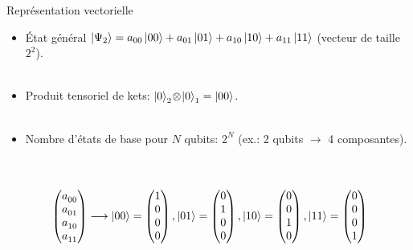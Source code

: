 \documentclass[aspectratio=169,12pt]{beamer}
\begin{document}
\begin{frame}{Représentation vectorielle}
  \begin{itemize}
    \item État général $\ket{\Psi_2} = a_{00}\ket{00}+a_{01}\ket{01}+a_{10}\ket{10}+a_{11}\ket{11}$ (vecteur de taille $2^2$).
    \\~\\
    \item Produit tensoriel de kets: $\ket{0}_2\!\otimes\!\ket{0}_1=\ket{00}$.
    \\~\\
    \item Nombre d'états de base pour $N$ qubits: $2^N$ (ex.: 2 qubits $\rightarrow$ 4 composantes).
  \end{itemize}
  ~\\~\\
  $\qquad \qquad\begin{pmatrix} 
    a_{00}^{} \\
    a_{01}^{} \\
    a_{10}^{}\\
    a_{11}^{} \\
\end{pmatrix} \longrightarrow \ket{00} = \begin{pmatrix} 
    1\\
    0\\
    0\\
    0\\
\end{pmatrix} , \ket{01} = \begin{pmatrix} 
    0\\
    1\\
    0\\
    0\\
\end{pmatrix}, \ket{10} = \begin{pmatrix} 
    0\\
    0\\
    1\\
    0\\
\end{pmatrix} , \ket{11} = \begin{pmatrix} 
    0\\
    0\\
    0\\
    1\\
\end{pmatrix}  $
\end{frame}
\end{document}
